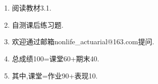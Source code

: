 \documentclass[professionalfont]{beamer}
\begin{document}
\section*{}
\begin{frame}
	\begin{enumerate}
		 \item  阅读教材3.1.
		 \item 自测课后练习题.
		 \item 欢迎通过邮箱nonlife\_actuarial@163.com提问.
		\item 总成绩100=课堂60+期末40.
		\item 其中,课堂=作业90+表现10.
	\end{enumerate}
\end{frame}
\end{document}
